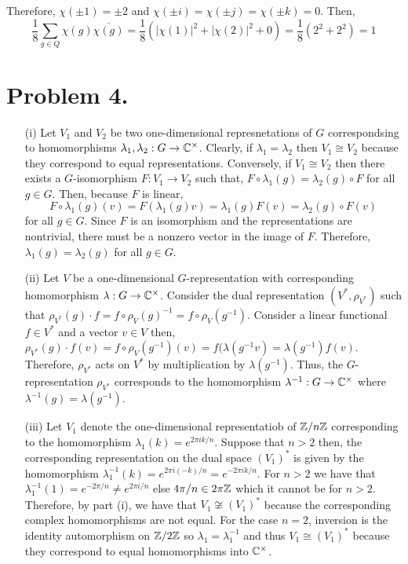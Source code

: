 \documentclass[12pt]{extarticle}
\begin{document}
Therefore, $\chi(\pm 1) = \pm 2$ and $\chi(\pm i) = \chi(\pm j) = \chi(\pm k) = 0$. Then, 
\[ \frac{1}{8} \sum_{g \in Q} \chi(g) \overline{\chi(g)} = \frac{1}{8} \left( |\chi(1)|^2 + |\chi(2)|^2 + 0 \right) = \frac{1}{8} \left( 2^2 + 2^2 \right) = 1\]

\section*{Problem 4.}

\begin{enumerate}
\item[(i)]
Let $V_1$ and $V_2$ be two one-dimensional represnetations of $G$ correspondsing to homomorphisms $\lambda_1, \lambda_2 : G \to \mathbb{C}^\times$. Clearly, if $\lambda_1 = \lambda_2$ then $V_1 \cong V_2$ because they correspond to equal representations. Conversely, if $V_1 \cong V_2$ then there exists a $G$-isomorphism $F : V_1 \to V_2$ such that, $F \circ \lambda_1(g) = \lambda_2(g) \circ F$ for all $g \in G$. Then, because $F$ is linear, 
\[F \circ \lambda_1(g) (v) = F(\lambda_1(g) v) = \lambda_1(g) F(v) = \lambda_2(g) \circ F(v)\] for all $g \in G$. Since $F$ is an isomorphism and the representations are nontrivial, there must be a nonzero vector in the image of $F$. Therefore, $\lambda_1(g) = \lambda_2(g)$ for all $g \in G$. 
\item[(ii)]
Let $V$ be a one-dimensional $G$-representation with corresponding homomorphism $\lambda : G \to \mathbb{C}^\times$. Consider the dual representation $(V^*, \rho_{V^*})$ such that $\rho_{V^*}(g) \cdot f = f \circ \rho_V(g)^{-1}= f \circ \rho_V(g^{-1})$. Consider a linear functional $f \in V^*$ and a vector $v \in V$ then, $\rho_{V^*}(g) \cdot f(v) = f \circ \rho_V(g^{-1})(v) = f(\lambda(g^{-1}v) = \lambda(g^{-1}) f(v)$. Therefore, $\rho_{V^*}$ acts on $V^*$ by multiplication by $\lambda(g^{-1})$. Thus, the $G$-representation $\rho_{V^*}$ corresponds to the homomorphism $\lambda^{-1} : G \to \mathbb{C}^\times$ where $\lambda^{-1}(g) = \lambda(g^{-1})$.   

\item[(iii)]
Let $V_1$ denote the one-dimensional representatiob of $\mathbb{Z}/n\mathbb{Z}$ corresponding to the homomorphism $\lambda_1(k) = e^{2 \pi i k / n}$. Suppose that $n > 2$ then, the corresponding representation on the dual space $(V_1)^*$ is given by the homomorphism $\lambda_1^{-1}(k) = e^{2 \pi i (-k)/n} = e^{- 2\pi i k /n}$. For $n > 2$ we have that $\lambda_1^{-1}(1) = e^{- 2 \pi / n} \neq e^{2 \pi i /n}$ else $4 \pi / n \in 2 \pi \mathbb{Z}$ which it cannot be for $n > 2$. Therefore, by part (i), we have that $V_1 \not\cong (V_1)^*$ because the corresponding complex homomorphisms are not equal. For the case $n = 2$, inversion is the identity automorphism on $\mathbb{Z} / 2 \mathbb{Z}$ so $\lambda_1 = \lambda_1^{-1}$ and thus $V_1 \cong (V_1)^*$ because they correspond to equal homomorphisms into $\mathbb{C}^\times$.   
\end{enumerate}
\end{document}
